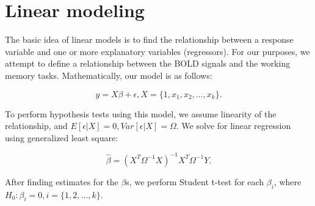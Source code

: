 \section{Linear modeling} 

The basic idea of linear models is to find the relationship between a response 
variable and one or more explanatory variables (regressors). For our purposes, 
we attempt to define a relationship between the BOLD signals and the working 
memory tasks. Mathematically, our model is as follows: 

$$y = X \beta + \epsilon, X = \{1, x_1, x_2, \ldots, x_k\}.$$

To perform hypothesis tests using this model, we assume linearity of the 
relationship, and $E [\epsilon | X ] = 0, Var [ \epsilon | X ] = \Omega$. We 
solve for linear regression using generalized least square: 

$$\hat{\beta} = (X^T \Omega^{-1}X)^{-1} X^T \Omega^{-1} Y.$$ 

After finding estimates for the $\beta$s, we perform Student t-test for each 
$\beta_i$, where $H_0: \beta_i = 0, i = \{1, 2, \ldots, k\}$.
